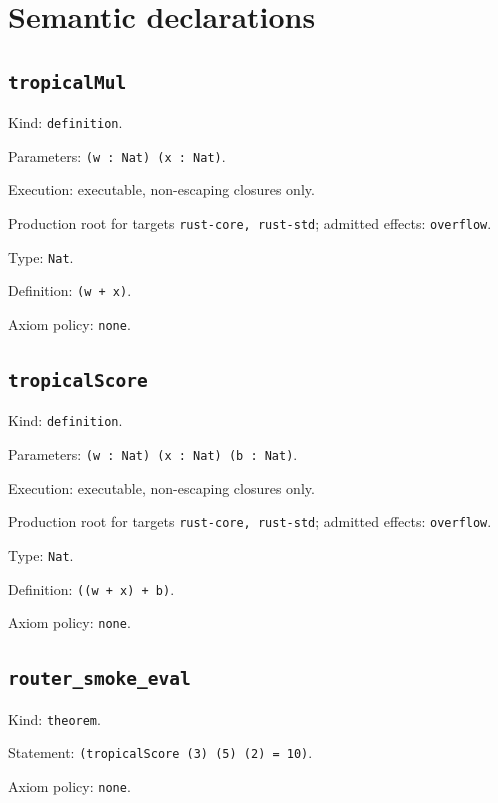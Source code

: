 \documentclass[11pt]{article}
\begin{document}
\section*{Semantic declarations}
\subsection*{\texttt{tropicalMul}}
\noindent Kind: \texttt{definition}.\par
\noindent Parameters: \texttt{(w : Nat) (x : Nat)}.\par
\noindent Execution: executable, non-escaping closures only.\par
\noindent Production root for targets \texttt{rust-core, rust-std}; admitted effects: \texttt{overflow}.\par
\noindent Type: \texttt{Nat}.\par
\noindent Definition: \texttt{(w + x)}.\par
\noindent Axiom policy: \texttt{none}.\par
\subsection*{\texttt{tropicalScore}}
\noindent Kind: \texttt{definition}.\par
\noindent Parameters: \texttt{(w : Nat) (x : Nat) (b : Nat)}.\par
\noindent Execution: executable, non-escaping closures only.\par
\noindent Production root for targets \texttt{rust-core, rust-std}; admitted effects: \texttt{overflow}.\par
\noindent Type: \texttt{Nat}.\par
\noindent Definition: \texttt{((w + x) + b)}.\par
\noindent Axiom policy: \texttt{none}.\par
\subsection*{\texttt{router\_smoke\_eval}}
\noindent Kind: \texttt{theorem}.\par
\noindent Statement: \texttt{(tropicalScore (3) (5) (2) = 10)}.\par
\noindent Axiom policy: \texttt{none}.\par
\end{document}
